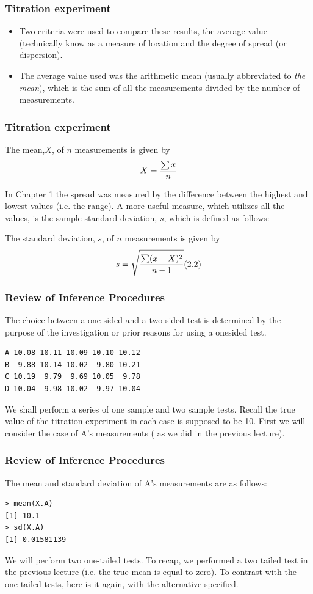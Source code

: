 \documentclass{beamer}
\begin{document}
\begin{frame}
	\frametitle{Titration experiment}
	
\begin{itemize}
\item	Two criteria were used to compare these results, the average value (technically know
	as a measure of location and the degree of spread (or dispersion). 
\item The average value
	used was the arithmetic mean (usually abbreviated to \emph{the mean}), which is the sum
	of all the measurements divided by the number of measurements.	
\end{itemize}	

	
\end{frame}
\begin{frame}
	\frametitle{Titration experiment}	
	The mean,$\bar{X}$, of $n$ measurements is given by \[ \bar{X}  = {\sum{x} \over n} \]
	
	In Chapter 1 the spread was measured by the difference between the highest and
	lowest values (i.e. the range). A more useful measure, which utilizes all the values, is the sample
	standard deviation, $s$, which is defined as follows:
	
	The standard deviation, $s$, of $n$ measurements is given by
	\[s=  \sqrt{ {\sum(x-\bar{X})^2 \over n-1} }  (2.2) \]
\end{frame}
\begin{frame}[fragile]
\frametitle{Review of Inference Procedures}
\large
The choice between a one-sided and a two-sided test is determined
by the purpose of the investigation or prior reasons for using a onesided
test.
\begin{verbatim}
A 10.08 10.11 10.09 10.10 10.12
B  9.88 10.14 10.02  9.80 10.21
C 10.19  9.79  9.69 10.05  9.78
D 10.04  9.98 10.02  9.97 10.04
\end{verbatim}
We shall perform a series of one sample and two sample tests.
Recall the true value of the titration experiment in each case is
supposed to be 10.
First we will consider the case of A’s measurements ( as we did in
the previous lecture).
\end{frame}
\begin{frame}[fragile]
	\frametitle{Review of Inference Procedures}
The mean and standard deviation of A’s measurements are as
follows:
\begin{framed}
\begin{verbatim}
> mean(X.A)
[1] 10.1
> sd(X.A)
[1] 0.01581139
\end{verbatim}
\end{framed}
We will perform two one-tailed tests. To recap, we performed a two
tailed test in the previous lecture (i.e. the true mean is equal to
zero). To contrast with the one-tailed tests, here is it again, with
the alternative specified.

\end{frame}
\end{document}
